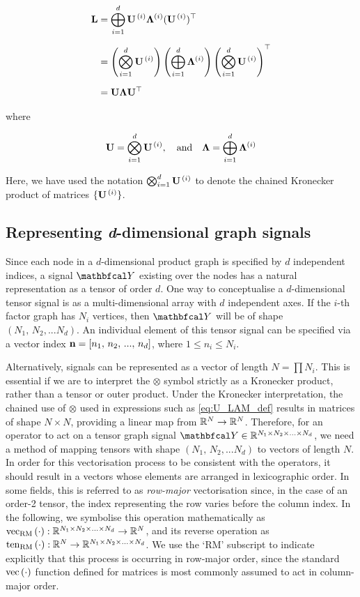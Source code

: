 \begin{align}
    \mathbf{L} &= \bigoplus_{i=1}^d \mathbf{U}^{\,(i)} \mathbf{\Lambda}^{(i)} (\mathbf{U}^{\,(i)})^\top \notag \\[0.2cm]
    &= \left( \bigotimes_{i=1}^d  \mathbf{U}^{\,(i)} \right) \left(\bigoplus_{i=1}^d \mathbf{\Lambda}^{(i)} \right) \left(\bigotimes_{i=1}^d  \mathbf{U}^{\,(i)} \right)^\top \notag \\[0.2cm]
    &= \mathbf{U} \mathbf{\Lambda} \mathbf{U}^\top 
\end{align}

\noindent where 

\begin{equation}
    \label{eq:U_LAM_def}
    \mathbf{U} =  \bigotimes_{i=1}^d  \mathbf{U}^{\,(i)} , \quad \text{and} \quad \mathbf{\Lambda} =  \bigoplus_{i=1}^d \mathbf{\Lambda}^{(i)}
\end{equation}


Here, we have used the notation $\bigotimes_{i=1}^d  \mathbf{U}^{\,(i)}$ to denote the chained Kronecker product of matrices $\{\mathbf{U}^{\,(i)}  \}$. 

\subsection{Representing \textit{d}-dimensional graph signals}

Since each node in a $d$-dimensional product graph is specified by $d$ independent indices, a signal $\Yt$ existing over the nodes has a natural representation as a tensor of order $d$. One way to conceptualise a $d$-dimensional tensor signal is as a multi-dimensional array with $d$ independent axes. If the $i$-th factor graph has $N_i$ vertices, then $\Yt$ will be of shape $(N_1, \, N_2 , ... N_d)$. An individual element of this tensor signal can be specified via a vector index $\mathbf{n} = [n_1,\, n_2,\, ...,\, n_d]$, where $1\leq n_i \leq N_i$.

Alternatively, signals can be represented as a vector of length $N = \prod N_i$. This is essential if we are to interpret the $\otimes$ symbol strictly as a Kronecker product, rather than a tensor or outer product. Under the Kronecker interpretation, the chained use of $\otimes$ used in expressions such as \cref{eq:U_LAM_def} results in matrices of shape $N \times N$, providing a linear map from $\mathbb{R}^{N} \rightarrow \mathbb{R}^{N}$. Therefore, for an operator to act on a tensor graph signal $\Yt \in \R^{N_1 \times N_2 \times ... \times N_d}$, we need a method of mapping tensors with shape $(N_1, \, N_2 , ... N_d)$ to vectors of length $N$. In order for this vectorisation process to be consistent with the operators, it should result in a vectors whose elements are arranged in lexicographic order. In some fields, this is referred to as \textit{row-major} vectorisation since, in the case of an order-2 tensor, the index representing the row varies before the column index. In the following, we symbolise this operation mathematically as $\text{\textup{vec}}_{\text{\textup{RM}}}\left(\cdot\right): \mathbb{R}^{N_1 \times N_2 \times ... \times N_d} \rightarrow \mathbb{R}^N$, and its reverse operation as $\text{\textup{ten}}_{\text{\textup{RM}}}\left(\cdot\right): \mathbb{R}^N \rightarrow \mathbb{R}^{N_1 \times N_2 \times ... \times N_d}$. We use the `RM' subscript to indicate explicitly that this process is occurring in row-major order, since the standard $\text{\textup{vec}}\left(\cdot\right)$ function defined for matrices is most commonly assumed to act in column-major order.  

